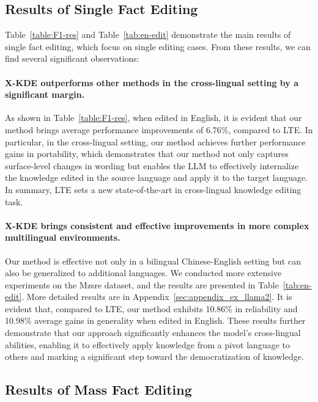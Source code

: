 \subsection{Results of Single Fact Editing} 
Table~\ref{table:F1-res} and Table~\ref{tab:en-edit} demonstrate the main results of single fact editing, which focus on single editing cases. From these results, we can find several significant observations:
\paragraph{X-KDE outperforms other methods in the cross-lingual setting by a significant margin.} 

As shown in Table~\ref{table:F1-res}, when edited in English, it is evident that our method brings average performance improvements of 6.76\%, compared to LTE. In particular, in the cross-lingual setting, our method achieves further performance gains in portability, which demonstrates that our method not only captures surface-level changes in wording but enables the LLM to effectively internalize the knowledge edited in the source language and apply it to the target language. In summary, LTE sets a new state-of-the-art in cross-lingual knowledge editing task.

\paragraph{X-KDE brings consistent and effective improvements in more complex multilingual environments.} 

Our method is effective not only in a bilingual Chinese-English setting but can also be generalized to additional languages. We conducted more extensive experiments on the Mzsre dataset, and the results are presented in Table~\ref{tab:en-edit}. More detailed results are in Appendix~\ref{sec:appendix_ex_llama2}. It is evident that, compared to LTE, our method exhibits 10.86\% in reliability and 10.98\% average gains in generality when edited in English. These results further demonstrate that our approach significantly enhances the model's cross-lingual abilities, enabling it to effectively apply knowledge from a pivot language to others and marking a significant step toward the democratization of knowledge.

\subsection{Results of Mass Fact Editing} 

